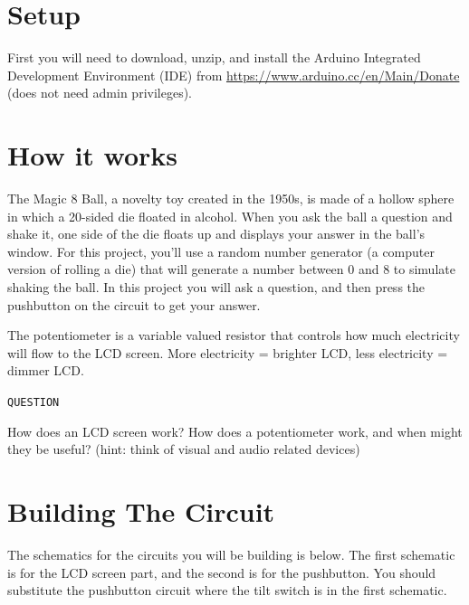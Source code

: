 \documentclass[11pt]{article}
\begin{document}
\section{Setup}
\label{sec:org85ada87}

First you will need to download, unzip, and install the Arduino Integrated Development Environment (IDE) from
\url{https://www.arduino.cc/en/Main/Donate} (does not need admin privileges).

\section{How it works}
\label{sec:org0e1724c}

The Magic 8 Ball, a novelty toy created in the 1950s, is made of a hollow sphere in which a 20-sided die floated in
alcohol. When you ask the ball a question and shake it, one side of the die floats up and displays your answer in the
ball’s window. For this project, you'll use a random number generator (a computer version of rolling a die) that will
generate a number between 0 and 8 to simulate shaking the ball. In this project you will ask a question, and then press
the pushbutton on the circuit to get your answer.

The potentiometer is a variable valued resistor that controls how much electricity will flow to the LCD screen. More
electricity = brighter LCD, less electricity = dimmer LCD.

\texttt{QUESTION}

How does an LCD screen work? How does a potentiometer work, and when might they be useful? (hint: think of visual and
audio related devices)

\section{Building The Circuit}
\label{sec:org9f69d75}

The schematics for the circuits you will be building is below. The first schematic is for the LCD screen part, and the
second is for the pushbutton. You should substitute the pushbutton circuit where the tilt switch is in the first
schematic.
\end{document}
